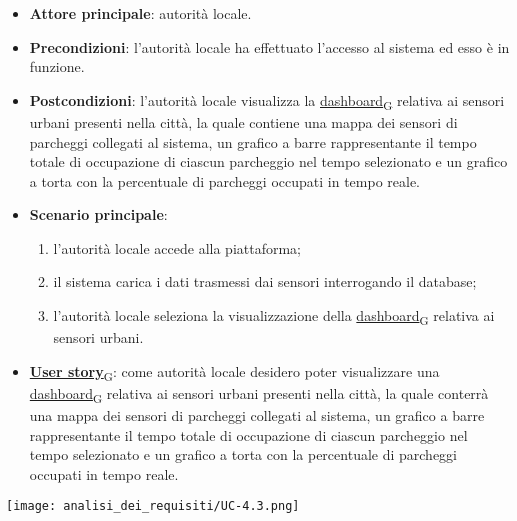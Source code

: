 \newpage
{}
\begin{itemize}
	\item \textbf{Attore principale}: autorità locale.
	\item \textbf{Precondizioni}: l'autorità locale ha effettuato l'accesso al sistema ed esso è in funzione.
	\item \textbf{Postcondizioni}: l'autorità locale visualizza la \href{https://7last.github.io/docs/pb/documentazione-interna/glossario\#dashboard}{dashboard\textsubscript{G}} relativa ai sensori urbani presenti nella città, la quale contiene una mappa dei sensori di parcheggi collegati al sistema, un grafico a barre rappresentante il tempo totale di occupazione di ciascun parcheggio nel tempo selezionato e un grafico a torta con la percentuale di parcheggi occupati in tempo reale.
	\item \textbf{Scenario principale}:
	      \begin{enumerate}
		      \item l'autorità locale accede alla piattaforma;
		      \item il sistema carica i dati trasmessi dai sensori interrogando il database;
		      \item l'autorità locale seleziona la visualizzazione della \href{https://7last.github.io/docs/pb/documentazione-interna/glossario\#dashboard}{dashboard\textsubscript{G}} relativa ai sensori urbani.
	      \end{enumerate}
	\item \href{https://7last.github.io/docs/pb/documentazione-interna/glossario\#user-story}{\textbf{User story}\textsubscript{G}}:
	      come autorità locale desidero poter visualizzare una \href{https://7last.github.io/docs/pb/documentazione-interna/glossario\#dashboard}{dashboard\textsubscript{G}} relativa ai sensori urbani presenti nella città, la quale conterrà una mappa dei sensori di parcheggi collegati al sistema, un grafico a barre rappresentante il tempo totale di occupazione di ciascun parcheggio nel tempo selezionato e un grafico a torta con la percentuale di parcheggi occupati in tempo reale.
\end{itemize}
\begin{center}
	\texttt{[image: analisi\_dei\_requisiti/UC-4.3.png]}
\end{center}

